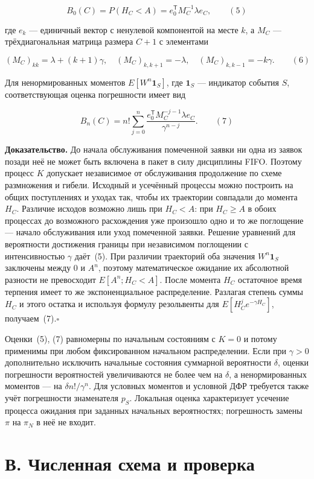 \[B_0(C)=P(H_C<A)=e_0^{\mathsf T}M_C^{-1}\lambda e_C,\qquad (5)\]

где $e_k$ --- единичный вектор с ненулевой компонентой на месте $k$, а $M_C$ --- трёхдиагональная матрица размера $C+1$ с элементами

\[(M_C)_{kk}=\lambda+(k+1)\gamma,\quad
 (M_C)_{k,k+1}=-\lambda,\quad (M_C)_{k,k-1}=-k\gamma.\qquad (6)\]

Для ненормированных моментов $E[W^n\mathbf1_S]$, где $\mathbf1_S$ --- индикатор события $S$, соответствующая оценка погрешности имеет вид

\[B_n(C)=n!\sum_{j=0}^{n}
 \frac{e_0^{\mathsf T}M_C^{-j-1}\lambda e_C}{\gamma^{n-j}}.\qquad (7)\]


\noindent\textbf{Доказательство.}
До начала обслуживания помеченной заявки ни одна из заявок позади неё не может быть включена в пакет в силу дисциплины FIFO. Поэтому процесс $K$ допускает независимое от обслуживания продолжение по схеме размножения и гибели. Исходный и усечённый процессы можно построить на общих поступлениях и уходах так, чтобы их траектории совпадали до момента $H_C$. Различие исходов возможно лишь при $H_C<A$: при $H_C\geq A$ в обоих процессах до возможного расхождения уже произошло одно и то же поглощение --- начало обслуживания или уход помеченной заявки. Решение уравнений для вероятности достижения границы при независимом поглощении с интенсивностью $\gamma$ даёт~(5). При различии траекторий оба значения $W^n\mathbf1_S$ заключены между $0$ и $A^n$, поэтому математическое ожидание их абсолютной разности не превосходит $E[A^n;H_C<A]$. После момента $H_C$ остаточное время терпения имеет то же экспоненциальное распределение. Разлагая степень суммы $H_C$ и этого остатка и используя формулу резольвенты для $E[H_C^j e^{-\gamma H_C}]$, получаем~(7).\hfill$\square$

Оценки~(5), (7) равномерны по начальным состояниям с $K=0$ и потому применимы при любом фиксированном начальном распределении. Если при $\gamma>0$ дополнительно исключить начальные состояния суммарной вероятности $\delta$, оценки погрешности вероятностей увеличиваются не более чем на $\delta$, а ненормированных моментов --- на $\delta n!/\gamma^n$. Для условных моментов и условной ДФР требуется также учёт погрешности знаменателя $p_S$. Локальная оценка характеризует усечение процесса ожидания при заданных начальных вероятностях; погрешность замены $\pi$ на $\pi_N$ в неё не входит.

\section*{В. Численная схема и проверка}

